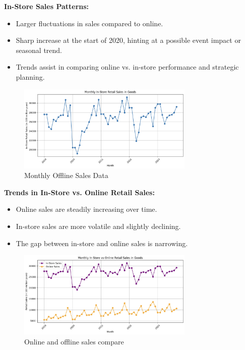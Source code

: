\documentclass{beamer}
\begin{document}
\textbf{In-Store Sales Patterns:}
\begin{itemize}
    \item Larger fluctuations in sales compared to online.
    \item Sharp increase at the start of 2020, hinting at a possible event impact or seasonal trend.
    \item Trends assist in comparing online vs. in-store performance and strategic planning.
\end{itemize}
\begin{figure}
    \centering
    \includegraphics[width=0.75\textwidth]{offline_sales_data.png}
    \caption{Monthly Offline Sales Data}
\end{figure}

\textbf{Trends in In-Store vs. Online Retail Sales:}
\begin{itemize}
    \item Online sales are steadily increasing over time.
    \item In-store sales are more volatile and slightly declining.
    \item The gap between in-store and online sales is narrowing.
\end{itemize}

\begin{figure}
    \centering
    \includegraphics[width=0.75\textwidth]{online_instore_compare.jpg}
    \caption{Online and offline sales compare}
    \end{figure}
\end{document}
